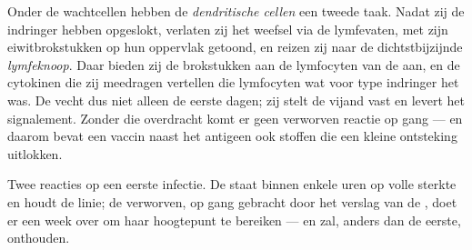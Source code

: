 \begin{proposition}[De overdracht]\label{prop:g12:innate-immunity:handover}
Onder de wachtcellen hebben de \emph{dendritische cellen}
een tweede taak. Nadat zij de indringer hebben opgeslokt, verlaten zij het
weefsel via de lymfevaten, met zijn eiwitbrokstukken op hun oppervlak
getoond, en reizen zij naar de dichtstbijzijnde \emph{lymfeknoop}. Daar
bieden zij de brokstukken aan de lymfocyten van de  aan,
en de cytokinen die zij meedragen vertellen die lymfocyten wat voor type
indringer het was. De  vecht dus niet alleen de eerste
dagen; zij stelt de vijand vast en levert het signalement. Zonder die
overdracht komt er geen verworven reactie op gang --- en daarom bevat een
vaccin naast het antigeen ook stoffen die een kleine ontsteking uitlokken.
\end{proposition}
\admitted

\begin{omfigure}

{\small Twee reacties op een eerste infectie. De  staat
binnen enkele uren op volle sterkte en houdt de linie; de verworven,
op gang gebracht door het verslag van de , doet er een
week over om haar hoogtepunt te bereiken --- en zal, anders dan de eerste,
onthouden.}
\end{omfigure}

